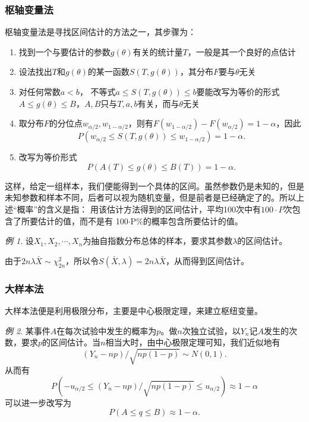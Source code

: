 \documentclass[a4paper,11pt]{article}%
\theoremstyle{remark}
\theoremstyle{remark}
\newtheorem*{example}{例}
\theoremstyle{definition}
\theoremstyle{definition}
\theoremstyle{plain}
\begin{document}
\subsubsection{枢轴变量法}
枢轴变量法是寻找区间估计的方法之一，其步骤为：
\begin{enumerate}
    \item 找到一个与要估计的参数$g(\theta)$有关的统计量$T$，一般是其一个良好的点估计
    \item 设法找出$T$和$g(\theta)$的某一函数$S(T,g(\theta))$，其分布$F$要与$\theta$无关
    \item 对任何常数$a<b$， 不等式$a\leq S(T,g(\theta))\leq b$要能改写为等价的形式$A\leq g(\theta)\leq B$，$A,B$只与$T,a,b$有关，而与$\theta$无关 
    \item 取分布$F$的分位点$w_{\alpha/2},w_{1-\alpha/2}$，则有$F(w_{1-\alpha/2})-F(w_{\alpha/2})=1-\alpha$，因此 
    \[P(w_{\alpha/2}\leq S(T,g(\theta))\leq w_{1-\alpha/2})=1-\alpha.\]
    \item 改写为等价形式 
    \[P(A(T)\leq g(\theta)\leq B(T))=1-\alpha.\]
\end{enumerate}
这样，给定一组样本，我们便能得到一个具体的区间。虽然参数仍是未知的，但是未知参数和样本不同，后者可以视为随机变量，但是前者是已经确定了的。所以上述“概率”的含义是指：
用该估计方法得到的区间估计，平均100次中有$100\cdot P$次包含了所要估计的值，而不是有 100$\cdot$P\%的概率包含所要估计的值。
\begin{example}
    设$X_1,X_2,\cdots,X_n$为抽自指数分布总体的样本，要求其参数$\lambda$的区间估计。 

    由于$2n\lambda\bar{X}\sim\chi_{2n}^2$，所以令$S(\bar{X},\lambda)=2n\lambda\bar{X}$，从而得到区间估计。
\end{example}
\subsubsection{大样本法}
大样本法便是利用极限分布，主要是中心极限定理，来建立枢纽变量。
\begin{example}
    某事件$A$在每次试验中发生的概率为$p$。做$n$次独立试验，以$Y_n$记$A$发生的次数，要求$p$的区间估计。当$n$相当大时，由中心极限定理可知，我们近似地有 
    \[(Y_n-np)/\sqrt{np(1-p)}\sim N(0,1).\]
    从而有
    \[P(-u_{\alpha/2}\leq (Y_n-np)/\sqrt{np(1-p)}\leq u_{\alpha/2})\approx 1-\alpha\]
    可以进一步改写为
    \[P(A\leq q\leq B)\approx 1-\alpha.\]
\end{example}
\end{document}
